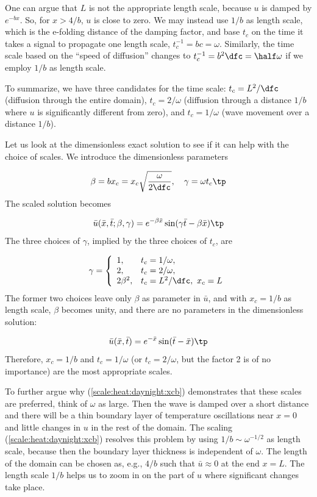 \documentclass[graybox,envcountchap,sectrefs,final]{svmonodo}
\begin{document}
One can argue that $L$ is not the appropriate length scale, because
$u$ is damped by $e^{-bx}$. So, for $x > 4/b$, $u$ is close to zero.
We may instead use $1/b$ as length scale, which is the e-folding distance of the
damping factor, and base
$t_c$ on the time it takes a signal to propagate one length scale,
$t_c^{-1}=bc=\omega$. Similarly, the time scale based on
the ``speed of diffusion'' changes to
$t_c^{-1}= b^2\dfc = \half\omega$ if we employ $1/b$ as length scale.

To summarize, we have three candidates for the time scale:
$t_c=L^2/\dfc$ (diffusion through the entire domain), $t_c=2/\omega$
(diffusion through a distance $1/b$ where $u$ is significantly
different from zero), and $t_c=1/\omega$ (wave movement over a
distance $1/b$).

Let us look at the dimensionless exact solution to see if it can help
with the choice of scales.  We introduce the dimensionless parameters

\[ \beta = bx_c = x_c\sqrt{\frac{\omega}{2\dfc}},\quad
\gamma = \omega t_c\tp\]
The scaled solution becomes

\[ \bar u(\bar x, \bar t; \beta,\gamma) = e^{-\beta\bar x}\sin(\gamma\bar t- \beta\bar x)\tp\]
The three choices of $\gamma$, implied by the three choices of $t_c$, are

\begin{equation}
\gamma = \left\lbrace\begin{array}{ll}
1, & t_c=1/\omega,\\ 
2, & t_c = 2/\omega,\\ 
2\beta^2, & t_c = L^2/\dfc,\ x_c=L
\end{array}\right.
\label{scale:heat:daynight:gamma3}
\end{equation}
The former two choices leave only $\beta$ as parameter in $\bar u$,
and with $x_c=1/b$ as length scale, $\beta$ becomes unity, and there
are no parameters in the dimensionless solution:

\begin{equation}
\bar u(\bar x, \bar t) = e^{-\bar x}\sin(\bar t - \bar x)\tp
\label{scale:heat:daynight:xcb}
\end{equation}
Therefore, $x_c=1/b$ and $t_c=1/\omega$ (or $t_c=2/\omega$, but the
factor 2 is of no importance) are the most appropriate scales.

To further argue why (\ref{scale:heat:daynight:xcb}) demonstrates
that these scales are
preferred, think of
$\omega$ as large. Then the wave is damped over a short
distance and there will be a thin boundary layer of temperature
oscillations near $x=0$ and little changes in $u$ in the rest of
the domain. The scaling (\ref{scale:heat:daynight:xcb}) resolves
this problem by using $1/b \sim \omega^{-1/2}$ as length scale,
because then the boundary layer thickness is independent of
$\omega$. The length of the domain can be chosen as, e.g., $4/b$
such that $\bar u\approx 0$ at the end $x=L$. The length scale $1/b$
helps us to zoom in on the part of $u$ where significant changes
take place.
\end{document}
